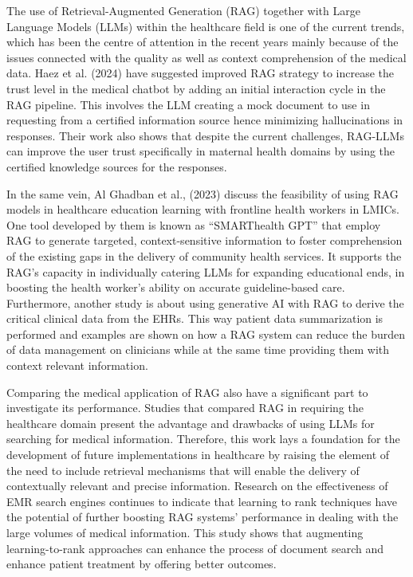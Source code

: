 The use of Retrieval-Augmented Generation (RAG) together with Large Language Models (LLMs) within the healthcare field is one of the current trends, which has been the centre of attention in the recent years mainly because of the issues connected with the quality as well as context comprehension of the medical data. Haez et al. (2024) have suggested improved RAG strategy to increase the trust level in the medical chatbot by adding an initial interaction cycle in the RAG pipeline. This involves the LLM creating a mock document to use in requesting from a certified information source hence minimizing hallucinations in responses. Their work also shows that despite the current challenges, RAG-LLMs can improve the user trust specifically in maternal health domains by using the certified knowledge sources for the responses\cite{10.1007/978-3-031-66538-7_22}.

In the same vein, Al Ghadban et al., (2023) discuss the feasibility of using RAG models in healthcare education learning with frontline health workers in LMICs. One tool developed by them is known as “SMARThealth GPT”\cite{wu2024medicalgraphragsafe} that employ RAG to generate targeted, context-sensitive information to foster comprehension of the existing gaps in the delivery of community health services. It supports the RAG's capacity in individually catering LLMs for expanding educational ends, in boosting the health worker's ability on accurate guideline-based care. Furthermore, another study is about using generative AI with RAG to derive the critical clinical data from the EHRs. This way patient data summarization is performed and examples are shown on how a RAG system can reduce the burden of data management on clinicians while at the same time providing them with context relevant information\cite{paper2}.

Comparing the medical application of RAG also have a significant part to investigate its performance. Studies that compared RAG in requiring the healthcare domain present the advantage and drawbacks of using LLMs for searching for medical information. Therefore, this work lays a foundation for the development of future implementations in healthcare by raising the element of the need to include retrieval mechanisms that will enable the delivery of contextually relevant and precise information\cite{xiong2024benchmarkingretrievalaugmentedgenerationmedicine}. Research on the effectiveness of EMR search engines continues to indicate that learning to rank techniques have the potential of further boosting RAG systems' performance in dealing with the large volumes of medical information. This study shows that augmenting learning-to-rank approaches can enhance the process of document search and enhance patient treatment by offering better outcomes\cite{YE202493}.

